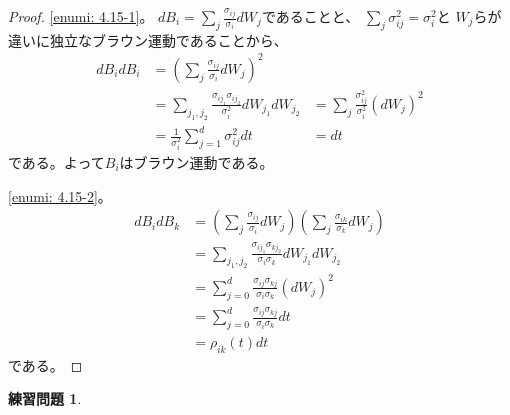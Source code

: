 \documentclass[uplatex]{jsarticle}
\theoremstyle{definition}
\newtheorem{prob}[prob]{練習問題}
\begin{document}
\begin{proof}
  \ref{enumi: 4.15-1}。
  \(dB_i = \sum_j \frac{\sigma_{ij}}{\sigma_i} dW_j\)であることと、
  \(\sum_j \sigma_{ij}^2 = \sigma_i^2\)と
  \(W_j\)らが違いに独立なブラウン運動であることから、
  \begin{align*}
    dB_idB_i
    &= \left( \sum_j\frac{\sigma_{ij}}{\sigma_i} dW_j \right)^2 \\
    &= \sum_{j_1,j_2}\frac{\sigma_{ij_1}\sigma_{ij_2}}{\sigma_i^2}
     dW_{j_1}dW_{j_2}
    &= \sum_j\frac{\sigma_{ij}^2}{\sigma_i^2}(dW_j)^2 \\
    &= \frac{1}{\sigma_i^2}\sum_{j=1}^d\sigma_{ij}^2dt
    &= dt
  \end{align*}
  である。よって\(B_i\)はブラウン運動である。

  \ref{enumi: 4.15-2}。
  \begin{align*}
    dB_idB_k
    &= \left( \sum_j\frac{\sigma_{ij}}{\sigma_i} dW_j \right)
    \left( \sum_j\frac{\sigma_{ik}}{\sigma_k} dW_j \right) \\
    &= \sum_{j_1,j_2}
    \frac{\sigma_{ij_1}\sigma_{kj_2}}{\sigma_i\sigma_k}
    dW_{j_1}dW_{j_2} \\
    &= \sum_{j=0}^d
    \frac{\sigma_{ij}\sigma_{kj}}{\sigma_i\sigma_k} (dW_j)^2 \\
    &= \sum_{j=0}^d
    \frac{\sigma_{ij}\sigma_{kj}}{\sigma_i\sigma_k} dt \\
    &= \rho_{ik}(t)dt
  \end{align*}
  である。
\end{proof}






\begin{prob}\label{prob: 4.16}

\end{prob}
\end{document}
